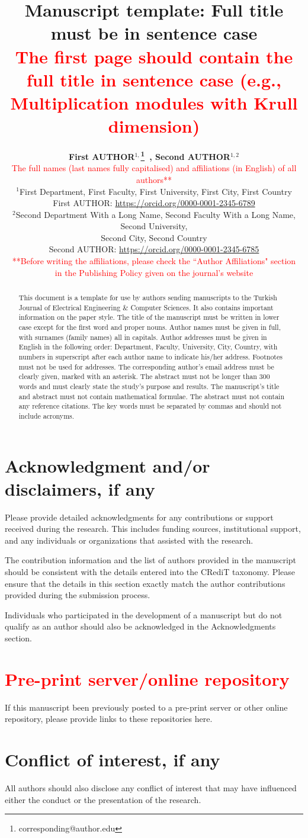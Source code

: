 \documentclass{elektr}
\title{
Manuscript template: Full title must be in sentence case \\
\textcolor{red}{\footnotesize The first page should contain the full title in sentence case (e.g., Multiplication modules with Krull dimension)}
}
\author[AUTHOR and AUTHOR]{
	\textbf{First AUTHOR$^{1,}$\thanks{corresponding@author.edu}~, Second AUTHOR$^{1,2}$}\\
	\textcolor{red}{The full names (last names fully capitalised) and affiliations (in English) of all authors**}\\ 
	$^{1}$First Department, First Faculty, First University, First City, First Country\\ 	First AUTHOR: \url{https://orcid.org/0000-0001-2345-6789} \\
	$^{2}$Second Department With a Long Name, Second Faculty With a Long Name, Second University,\\ Second City, Second Country\\ Second AUTHOR: \url{https://orcid.org/0000-0001-2345-6785}\\
	\textcolor{red}{**Before writing the affiliations, please check the ``Author Affiliations" section}\\ 
	\textcolor{red}{in the Publishing Policy given on the journal’s website}\\ [1.8em]

\rec{...}
\acc{...}
\finv{...}
}
\begin{document}
	
	\maketitle
	
	
	\begin{abstract}
		This document is a template for use by authors sending manuscripts to the Turkish Journal of Electrical Engineering {\&} Computer Sciences. It also contains important information on the paper style. The title of the manuscript must be written in lower case except for the first word and proper nouns. Author names must be given in full, with surnames (family names) all in capitals. Author addresses must be given in English in the following order: Department, Faculty, University, City, Country, with numbers in superscript after each author name to indicate his/her address. Footnotes must not be used for addresses. The corresponding author's email address must be clearly given, marked with an asterisk. The abstract must not be longer than 300 words and must clearly state the study's purpose and results. The manuscript's title and abstract must not contain mathematical formulae. The abstract must not contain any reference citations. The key words must be separated by commas and should not include acronyms.
		
	\end{abstract}
	
\section*{Acknowledgment and/or disclaimers, if any}
Please provide detailed acknowledgments for any contributions or support received during the research. This includes funding sources, institutional support, and any individuals or organizations that assisted with the research. 

The contribution information and the list of authors provided in the manuscript should be consistent with the details entered into the CRediT taxonomy. Please ensure that the details in this section exactly match the author contributions provided during the submission process.

Individuals who participated in the development of a manuscript but do not qualify as an author should also be acknowledged in the Acknowledgments section.

\section*{\textcolor{red}{Pre-print server/online repository}}
If this manuscript been previously posted to a pre-print server or other online repository, please provide links to these repositories here.  

\section*{Conflict of interest, if any}
All authors should also disclose any conflict of interest that may have influenced either the conduct or the presentation of the research.
\end{document}

